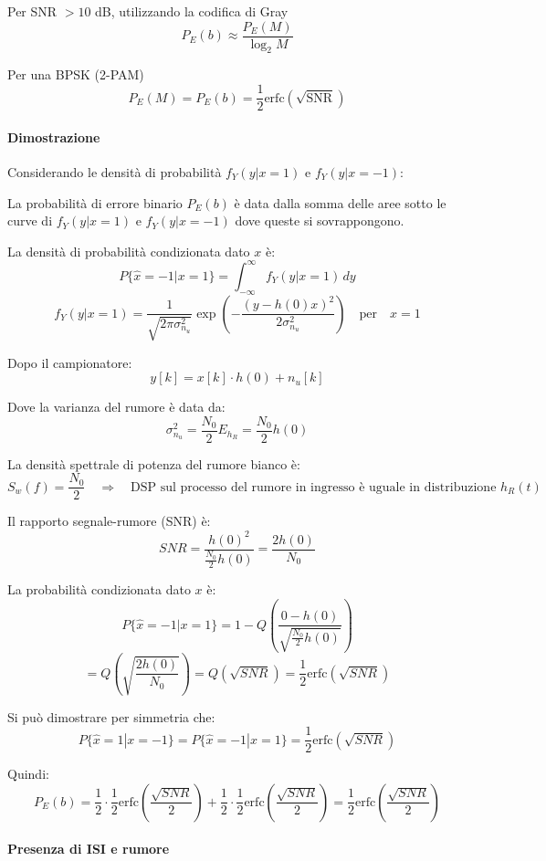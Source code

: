 \documentclass{article}
\begin{document}
Per SNR $> 10$ dB, utilizzando la codifica di Gray
\[
P_E(b) \approx \frac{P_E(M)}{\log_2 M}
\]

Per una BPSK (2-PAM)
\[
P_E(M) = P_E(b) = \frac{1}{2} \text{erfc}\left(\sqrt{\text{SNR}}\right)
\]

\paragraph{Dimostrazione}

Considerando le densità di probabilità $f_Y(y|x=1)$ e $f_Y(y|x=-1)$:

La probabilità di errore binario $P_E(b)$ è data dalla somma delle aree sotto le curve di $f_Y(y|x=1)$ e $f_Y(y|x=-1)$ dove queste si sovrappongono.



La densità di probabilità condizionata dato $x$ è:
\[
P\{ \hat{x} = -1 | x = 1 \} = \int_{-\infty}^{\infty} f_Y(y | x = 1) \, dy
\]
\[
f_Y(y | x = 1) = \frac{1}{\sqrt{2\pi \sigma_{n_u}^2}} \exp \left( -\frac{(y - h(0)x)^2}{2\sigma_{n_u}^2} \right) \quad \text{per} \quad x = 1
\]

Dopo il campionatore:
\[
y[k] = x[k]\cdot h(0) + n_u[k]
\]

Dove la varianza del rumore è data da:
\[
\sigma_{n_u}^2 = \frac{N_0}{2} E_{h_R} = \frac{N_0}{2} h(0)
\]

La densità spettrale di potenza del rumore bianco è:
\[
S_w(f) = \frac{N_0}{2} \quad \Rightarrow \quad \text{DSP sul processo del rumore in ingresso è uguale in distribuzione } h_R(t)
\]

Il rapporto segnale-rumore (SNR) è:
\[
SNR = \frac{h(0)^2}{\frac{N_0}{2} h(0)} = \frac{2 h(0)}{N_0}
\]

La probabilità condizionata dato $x$ è:
\[
P\{ \hat{x} = -1 | x = 1 \} = 1 - Q\left( \frac{0 - h(0)}{\sqrt{\frac{N_0}{2} h(0)}} \right)
\]
\[
= Q\left( \sqrt{\frac{2 h(0)}{N_0}} \right) = Q\left( \sqrt{SNR} \right) = \frac{1}{2} \text{erfc}\left( \sqrt{SNR} \right)
\]

Si può dimostrare per simmetria che:
\[
P\{ \hat{x} = 1 | x = -1 \} = P\{ \hat{x} = -1 | x = 1 \} = \frac{1}{2} \text{erfc}\left( \sqrt{SNR} \right)
\]


Quindi:
\[
P_E(b) = \frac{1}{2} \cdot \frac{1}{2} \text{erfc}\left( \frac{\sqrt{SNR}}{2} \right) + \frac{1}{2} \cdot \frac{1}{2} \text{erfc}\left( \frac{\sqrt{SNR}}{2} \right) = \frac{1}{2} \text{erfc}\left( \frac{\sqrt{SNR}}{2} \right)
\]

\paragraph{Presenza di ISI e rumore}
\end{document}
